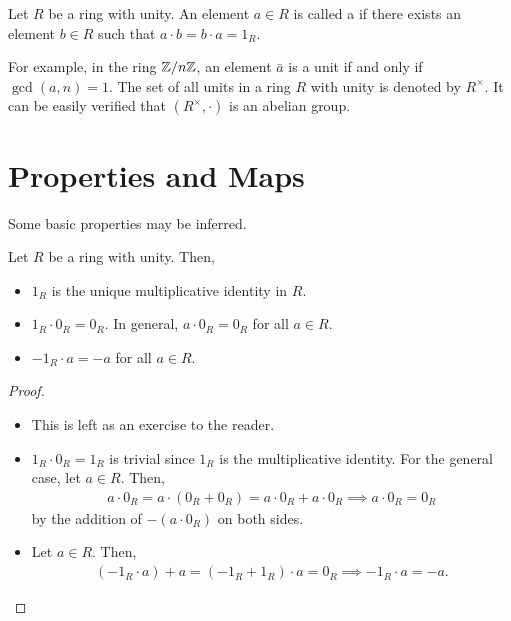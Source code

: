 \begin{definition}
    Let $R$ be a ring with unity. An element $a \in R$ is called a  if there exists an element $b \in R$ such that $a \cdot b = b \cdot a = 1_{R}$.
\end{definition}

For example, in the ring $\mathbb{Z}/n\mathbb{Z}$, an element $\bar{a}$ is a unit if and only if $\gcd(a, n) = 1$. The set of all units in a ring $R$ with unity is denoted by $R^{\times}$. It can be easily verified that $(R^{\times}, \cdot)$ is an abelian group.

\section{Properties and Maps}
Some basic properties may be inferred.

\begin{proposition}
    Let $R$ be a ring with unity. Then,
    \begin{itemize}
    \item $1_{R}$ is the unique multiplicative identity in $R$.
    \item $1_{R} \cdot 0_{R} = 0_{R}$. In general, $a \cdot 0_{R} = 0_{R}$ for all $a \in R$.
    \item $-1_{R} \cdot a = -a$ for all $a \in R$.
\end{itemize}
\begin{proof}
    \begin{itemize}
        \item This is left as an exercise to the reader.
        \item $1_{R} \cdot 0_{R} = 1_{R}$ is trivial since $1_{R}$ is the multiplicative identity. For the general case, let $a \in R$. Then,
        \begin{align}
            a \cdot 0_{R} = a \cdot (0_{R} + 0_{R}) = a \cdot 0_{R} + a \cdot 0_{R} \implies a \cdot 0_{R} = 0_{R}
        \end{align}
        by the addition of $-(a \cdot 0_{R})$ on both sides.
        \item Let $a \in R$. Then,
        \begin{align}
            (-1_{R} \cdot a) + a = (-1_{R} + 1_{R}) \cdot a = 0_{R} \implies -1_{R} \cdot a = -a.
        \end{align}
    \end{itemize}
\end{proof}
\end{proposition}

